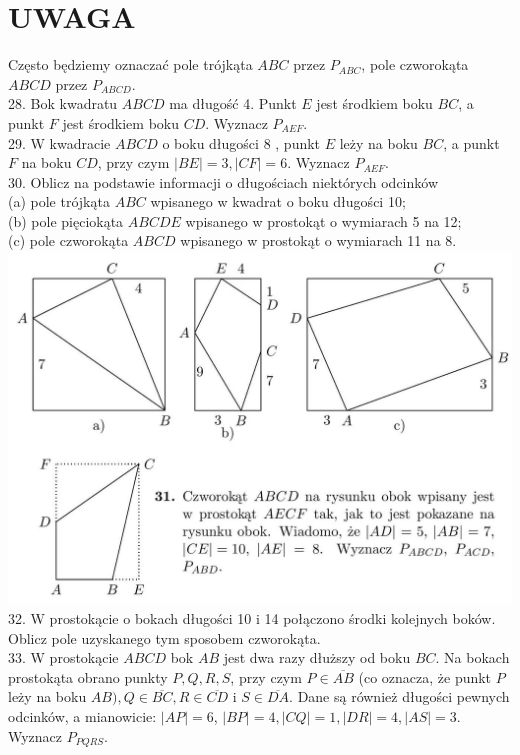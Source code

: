 \documentclass[10pt]{article}
\begin{document}
\section*{UWAGA}
Często będziemy oznaczać pole trójkąta \(A B C\) przez \(P_{A B C}\), pole czworokąta \(A B C D\) przez \(P_{A B C D}\).\\
28. Bok kwadratu \(A B C D\) ma długość 4. Punkt \(E\) jest środkiem boku \(B C\), a punkt \(F\) jest środkiem boku \(C D\). Wyznacz \(P_{A E F}\).\\
29. W kwadracie \(A B C D\) o boku długości 8 , punkt \(E\) leży na boku \(B C\), a punkt \(F\) na boku \(C D\), przy czym \(|B E|=3,|C F|=6\). Wyznacz \(P_{A E F}\).\\
30. Oblicz na podstawie informacji o długościach niektórych odcinków\\
(a) pole trójkąta \(A B C\) wpisanego w kwadrat o boku długości 10;\\
(b) pole pięciokąta \(A B C D E\) wpisanego w prostokąt o wymiarach 5 na 12;\\
(c) pole czworokąta \(A B C D\) wpisanego w prostokąt o wymiarach 11 na 8.\\
\includegraphics[max width=\textwidth, center]{2024_11_21_8f01584889ff06348ae7g-195}\\
32. W prostokącie o bokach długości 10 i 14 połączono środki kolejnych boków. Oblicz pole uzyskanego tym sposobem czworokąta.\\
33. W prostokącie \(A B C D\) bok \(A B\) jest dwa razy dłuższy od boku \(B C\). Na bokach prostokąta obrano punkty \(P, Q, R, S\), przy czym \(P \in \overline{A B}\) (co oznacza, że punkt \(P\) leży na boku \(A B), Q \in \overline{B C}, R \in \overline{C D}\) i \(S \in \overline{D A}\). Dane są również długości pewnych odcinków, a mianowicie: \(|A P|=6\), \(|B P|=4,|C Q|=1,|D R|=4,|A S|=3\). Wyznacz \(P_{P Q R S}\).\\
\end{document}
